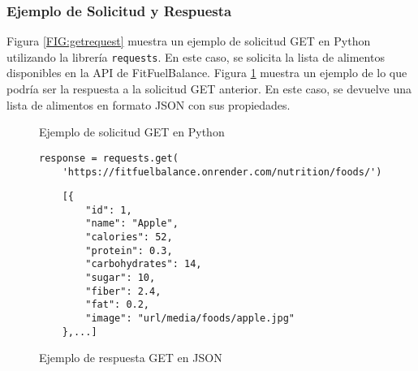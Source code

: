 \subsubsection{Ejemplo de Solicitud y Respuesta}
Figura \ref{FIG:getrequest} muestra un ejemplo de solicitud GET en Python utilizando la librería \texttt{requests}. En este caso, se solicita la lista de alimentos disponibles en la API de FitFuelBalance. Figura \ref{FIG:getresponse} muestra un ejemplo de lo que podría ser la respuesta a la solicitud GET anterior. En este caso, se devuelve una lista de alimentos en formato JSON con sus propiedades.

\begin{figure}[ht]
\centering
\begin{minipage}[b]{0.45\textwidth}
\caption{Ejemplo de solicitud GET en Python}
\label{FIG:getrequest}
\begin{verbatim}
response = requests.get(
    'https://fitfuelbalance.onrender.com/nutrition/foods/')
\end{verbatim}
\end{minipage}
\hspace{0.05\textwidth}
\begin{minipage}[b]{0.45\textwidth}
\caption{Ejemplo de respuesta GET en JSON}
\label{FIG:getresponse}
\begin{verbatim}
    [{
        "id": 1,
        "name": "Apple",
        "calories": 52,
        "protein": 0.3,
        "carbohydrates": 14,
        "sugar": 10,
        "fiber": 2.4,
        "fat": 0.2,
        "image": "url/media/foods/apple.jpg"
    },...]
\end{verbatim}
\end{minipage}
\end{figure}
